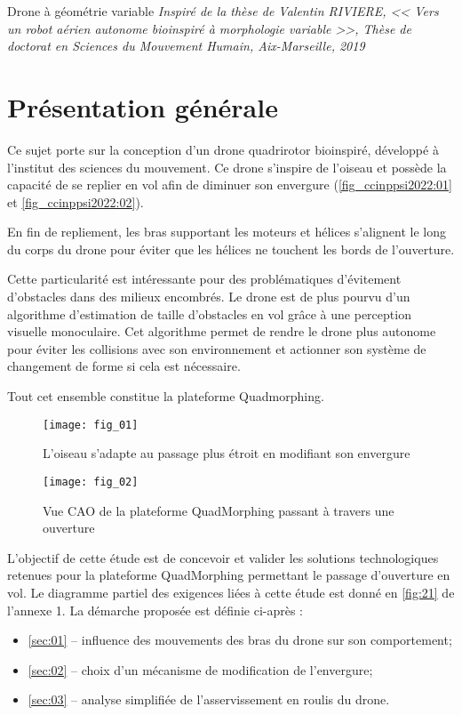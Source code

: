 
Drone à géométrie variable
\textit{Inspiré de la thèse de Valentin RIVIERE,
<< Vers un robot aérien autonome bio­inspiré à morphologie variable >>,
Thèse de doctorat en Sciences du Mouvement Humain, Aix-­Marseille, 2019}

\section*{Présentation générale}


Ce sujet porte sur la conception d’un drone quadrirotor bio­inspiré, développé à l’institut des
sciences du mouvement. Ce drone s’inspire de l’oiseau et possède la capacité de se replier
en vol afin de diminuer son envergure (\autoref{fig_ccinppsi2022:01} et \autoref{fig_ccinppsi2022:02}).

En fin de repliement, les bras supportant les moteurs et hélices s’alignent le long du corps
du drone pour éviter que les hélices ne touchent les bords de l’ouverture.

Cette particularité est intéressante pour des problématiques d’évitement d’obstacles dans
des milieux encombrés. Le drone est de plus pourvu d’un algorithme d’estimation de taille
d’obstacles en vol grâce à une perception visuelle monoculaire. Cet algorithme permet de
rendre le drone plus autonome pour éviter les collisions avec son environnement et actionner
son système de changement de forme si cela est nécessaire.

Tout cet ensemble constitue la plateforme Quadmorphing.


\begin{minipage}[c]{.48\linewidth}
\begin{figure}[H]
\centering
\texttt{[image: fig\_01]}
\caption{\label{fig_ccinppsi2022:01} L’oiseau s’adapte au passage
plus étroit en modifiant son envergure}
\end{figure}
\end{minipage}\hfill
\begin{minipage}[c]{.48\linewidth}
\begin{figure}[H]
\centering
\texttt{[image: fig\_02]}
\caption{\label{fig_ccinppsi2022:02} Vue CAO de la plateforme QuadMorphing passant à travers une ouverture}
\end{figure}
\end{minipage}

\begin{obj}
L'objectif de cette étude est de concevoir et valider les solutions technologiques retenues
pour la plateforme QuadMorphing permettant le passage d’ouverture en vol. Le diagramme
partiel des exigences liées à cette étude est donné en \autoref{fig:21} de l’annexe 1.
La démarche proposée est définie ci­-après :
\begin{itemize}
\item ­\autoref{sec:01} --­ influence des mouvements des bras du drone sur son comportement;
\item ­\autoref{sec:02} --­ choix d’un mécanisme de modification de l’envergure;
\item ­\autoref{sec:03} --­ analyse simplifiée de l’asservissement en roulis du drone.
\end{itemize}
\end{obj}
